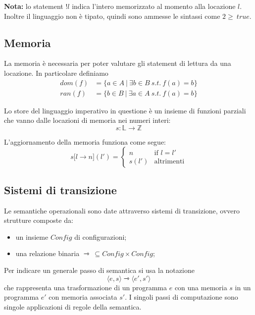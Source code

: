 \documentclass[a4paper, 11pt]{article}
\begin{document}
\textbf{Nota:} lo statement $!l$ indica l'intero memorizzato al momento alla locazione $l$. Inoltre il linguaggio non è tipato, quindi sono ammesse le sintassi come $2 \geq\ true$.

\subsection{Memoria}
La memoria è necessaria per poter valutare gli statement di lettura da una locazione. In particolare definiamo \begin{align*}
 dom(f) &= \lbrace a \in A\ |\ \exists b \in B\ s.t.\ f(a)=b \rbrace  \\
 ran(f) &= \lbrace b \in B\ |\ \exists a \in A\ s.t.\ f(a)=b \rbrace
 \end{align*}
 
 Lo store del linguaggio imperativo in questione è un insieme di funzioni parziali che vanno dalle locazioni di memoria nei numeri interi: \[ s: \mathbb{L} \to \mathbb{Z} \]
 
 L'aggiornamento della memoria funziona come segue: \[ s \lbrack l \rightarrow n \rbrack (l') = \begin{cases}
 n &\text{if } l=l' \\
 s(l') &\text{altrimenti}
 \end{cases} \]
 
 \subsection{Sistemi di transizione}
 Le semantiche operazionali sono date attraverso sistemi di transizione, ovvero strutture composte da: \begin{itemize}
 	\item un insieme $Config$ di configurazioni;
 	\item una relazione binaria $\rightarrowtriangle\ \subseteq Config \times Config$;
 \end{itemize}

Per indicare un generale passo di semantica si usa la notazione \[ \langle e, s \rangle \rightarrowtriangle \langle e', s' \rangle \]
che rappresenta una trasformazione di un programma $e$ con una memoria $s$ in un programma $e'$ con memoria associata $s'$.
I singoli passi di computazione sono singole applicazioni di regole della semantica.
\end{document}
